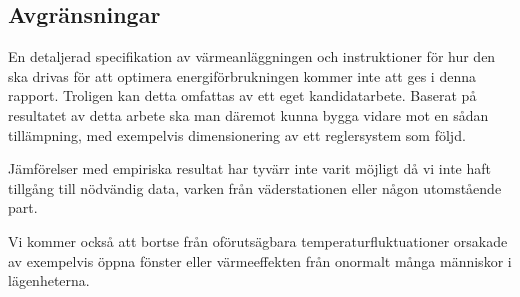 \subsection{Avgränsningar}

En detaljerad specifikation av värmeanläggningen och instruktioner för hur den ska drivas för att optimera energiförbrukningen kommer inte att ges i denna rapport. Troligen kan detta omfattas av ett eget kandidatarbete. Baserat på resultatet av detta arbete ska man däremot kunna bygga vidare mot en sådan tillämpning, med exempelvis dimensionering av ett reglersystem som följd.

Jämförelser med empiriska resultat har tyvärr inte varit möjligt då vi inte haft tillgång till nödvändig data, varken från väderstationen eller någon utomstående part.

Vi kommer också att bortse från oförutsägbara temperaturfluktuationer orsakade av exempelvis öppna fönster eller värmeeffekten från onormalt många människor i lägenheterna.
